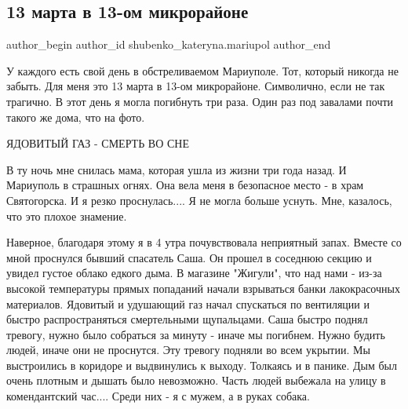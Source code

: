 
 
 
 
 

\subsection{13 марта в 13-ом микрорайоне}
\label{sec:17_04_2022.fb.shubenko_kateryna.mariupol.1.13_marta_13_mikrorajon}

\ifcmt
 author_begin
   author_id shubenko_kateryna.mariupol
 author_end
\fi

У каждого есть свой  день в обстреливаемом Мариуполе. Тот, который никогда не
забыть. Для меня это 13 марта в 13-ом микрорайоне. Символично, если не так
трагично. В этот день я могла погибнуть три раза. Один раз под завалами почти
такого же дома, что на фото. 

ЯДОВИТЫЙ ГАЗ - СМЕРТЬ ВО СНЕ

В ту ночь мне снилась мама, которая ушла из жизни три года назад. И Мариуполь в
страшных огнях. Она вела меня в безопасное место - в храм Святогорска. И я
резко проснулась.... Я не могла больше уснуть. Мне, казалось, что это плохое
знамение. 

Наверное, благодаря этому я в 4 утра почувствовала неприятный запах. Вместе со
мной проснулся бывший спасатель Саша. Он прошел в соседнюю секцию и увидел
густое облако едкого дыма. В магазине "Жигули", что над нами - из-за высокой
температуры прямых попаданий начали взрываться банки лакокрасочных материалов.
Ядовитый и удушающий газ начал спускаться по вентиляции и быстро
распространяться смертельными щупальцами. Саша быстро поднял тревогу, нужно
было собраться за минуту - иначе мы погибнем. Нужно будить людей, иначе они не
проснутся. Эту тревогу подняли во всем укрытии. Мы выстроились в коридоре и
выдвинулись к выходу. Толкаясь и в панике. Дым был очень плотным и дышать было
невозможно. Часть людей выбежала на улицу в комендантский час.... Среди них - я
с мужем, а в руках собака.

